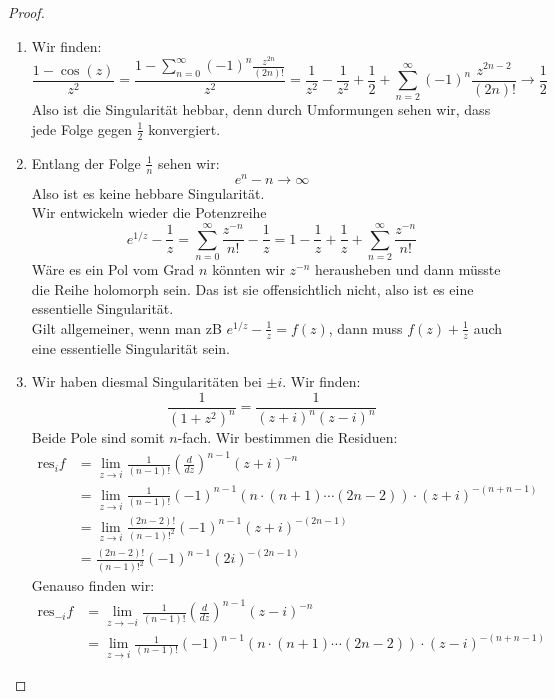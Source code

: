 \documentclass[11pt]{article}
\newcommand{\res}{\text{res}}
\begin{document}
    \begin{proof}
        \begin{enumerate}[label = (\alph*)]
            \item Wir finden:
            $$\frac{1-\cos (z)}{z^2} = \frac{1-\sum_{n=0}^\infty (-1)^n \frac{z^{2n}}{(2n)!}}{z^2} =
            \frac{1}{z^2}-\frac{1}{z^2}+\frac{1}{2} + \sum_{n=2}^\infty(-1)^n \frac{z^{2n-2}}{(2n)!}
            \to \frac{1}{2}$$
            Also ist die Singularität hebbar, denn durch Umformungen sehen wir, dass jede
            Folge gegen $\frac{1}{2}$ konvergiert.
            \item Entlang der Folge $\frac{1}{n}$ sehen wir:
            $$e^n - n \to \infty$$
            Also ist es keine hebbare Singularität. \\
            Wir entwickeln wieder die Potenzreihe
            $$e^{1/z}-\frac{1}{z} = \sum_{n=0}^\infty \frac{z^{-n}}{n!}-\frac{1}{z} = 1 -
            \frac{1}{z}+ \frac{1}{z} +\sum_{n=2}^\infty \frac{z^{-n}}{n!}$$
            Wäre es ein Pol vom Grad $n$ könnten wir $z^{-n}$ herausheben und dann müsste die Reihe
            holomorph sein. Das ist sie offensichtlich nicht, also ist es eine essentielle Singularität.
            \\ Gilt allgemeiner, wenn man zB $e^{1/z}-\frac{1}{z} = f(z)$, dann muss
            $f(z)+\frac{1}{z}$ auch eine essentielle Singularität sein.
            \item Wir haben diesmal Singularitäten bei $\pm i$. Wir finden:
            $$\frac{1}{(1+z^2)^n} = \frac{1}{(z+i)^n(z-i)^n}$$
            Beide Pole sind somit $n$-fach. Wir bestimmen die Residuen:
            $$\begin{aligned}
                  \res_i f &= \lim_{z\to i}\frac{1}{(n-1)!}\left(\frac{d}{dz}\right)^{n-1} (z+i)^{-n}\\& =
                  \lim_{z\to i}\frac{1}{(n-1)!} (-1)^{n-1} (n\cdot (n+1)\cdots (2n-2))\cdot (z+i)^{-(n+n-1)}
                  \\&= \lim_{z\to i}\frac{(2n-2)!}{(n-1)!^2} (-1)^{n-1}(z+i)^{-(2n-1)}\\
                  &= \frac{(2n-2)!}{(n-1)!^2} (-1)^{n-1}(2i)^{-(2n-1)}
            \end{aligned}$$
            Genauso finden wir:
            $$\begin{aligned}
                  \res_{-i} f &= \lim_{z\to -i}\frac{1}{(n-1)!}\left(\frac{d}{dz}\right)^{n-1} (z-i)^{-n}\\& =
                  \lim_{z\to i}\frac{1}{(n-1)!} (-1)^{n-1} (n\cdot (n+1)\cdots (2n-2))\cdot (z-i)^{-(n+n-1)}

\end{aligned}$$
\end{enumerate}
\end{proof}
\end{document}
